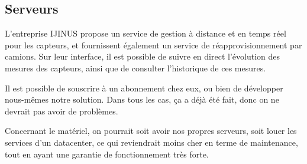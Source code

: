 \subsection{Serveurs}

L'entreprise IJINUS propose un service de gestion à distance et en temps
réel pour les capteurs, et fournissent également un service de
réapprovisionnement par camions.
Sur leur interface, il est possible de suivre en direct l'évolution des
mesures des capteurs, ainsi que de consulter l'historique de ces mesures.

Il est possible de souscrire à un abonnement chez eux, ou bien de développer
nous-mêmes notre solution. Dans tous les cas, ça a déjà été fait, donc on
ne devrait pas avoir de problèmes.

Concernant le matériel, on pourrait soit avoir nos propres serveurs, soit 
louer les services d'un datacenter, ce qui reviendrait moins cher en terme
de maintenance, tout en ayant une garantie de fonctionnement très forte.

